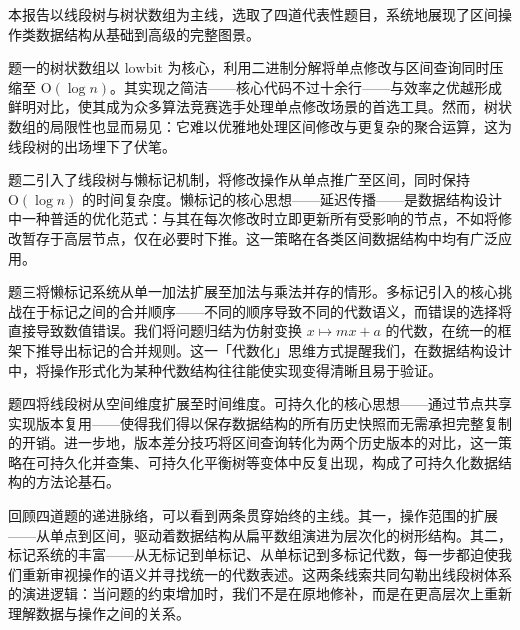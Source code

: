 \documentclass[12pt, a4paper]{academics}
\begin{document}
本报告以线段树与树状数组为主线，选取了四道代表性题目，系统地展现了区间操作类数据结构从基础到高级的完整图景。

题一的树状数组以 $\mathrm{lowbit}$ 为核心，利用二进制分解将单点修改与区间查询同时压缩至 $\mathrm{O}(\log n)$。其实现之简洁——核心代码不过十余行——与效率之优越形成鲜明对比，使其成为众多算法竞赛选手处理单点修改场景的首选工具。然而，树状数组的局限性也显而易见：它难以优雅地处理区间修改与更复杂的聚合运算，这为线段树的出场埋下了伏笔。

题二引入了线段树与懒标记机制，将修改操作从单点推广至区间，同时保持 $\mathrm{O}(\log n)$ 的时间复杂度。懒标记的核心思想——延迟传播——是数据结构设计中一种普适的优化范式：与其在每次修改时立即更新所有受影响的节点，不如将修改暂存于高层节点，仅在必要时下推。这一策略在各类区间数据结构中均有广泛应用。

题三将懒标记系统从单一加法扩展至加法与乘法并存的情形。多标记引入的核心挑战在于标记之间的合并顺序——不同的顺序导致不同的代数语义，而错误的选择将直接导致数值错误。我们将问题归结为仿射变换 $x \mapsto mx + a$ 的代数，在统一的框架下推导出标记的合并规则。这一「代数化」思维方式提醒我们，在数据结构设计中，将操作形式化为某种代数结构往往能使实现变得清晰且易于验证。

题四将线段树从空间维度扩展至时间维度。可持久化的核心思想——通过节点共享实现版本复用——使得我们得以保存数据结构的所有历史快照而无需承担完整复制的开销。进一步地，版本差分技巧将区间查询转化为两个历史版本的对比，这一策略在可持久化并查集、可持久化平衡树等变体中反复出现，构成了可持久化数据结构的方法论基石。

回顾四道题的递进脉络，可以看到两条贯穿始终的主线。其一，操作范围的扩展——从单点到区间，驱动着数据结构从扁平数组演进为层次化的树形结构。其二，标记系统的丰富——从无标记到单标记、从单标记到多标记代数，每一步都迫使我们重新审视操作的语义并寻找统一的代数表述。这两条线索共同勾勒出线段树体系的演进逻辑：当问题的约束增加时，我们不是在原地修补，而是在更高层次上重新理解数据与操作之间的关系。
\end{document}
